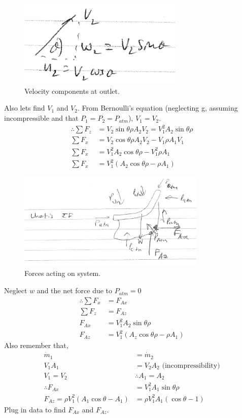 \documentclass[class=report, crop=false, 12pt,a4paper]{standalone}
\begin{document}
\begin{figure}
  \centering
  \includegraphics[width = 0.7\textwidth]{../img/Vanexample2}
  \caption{Velocity components at outlet.}
\end{figure}
Also lets find $V_1$ and $V_2$. From Bernoulli's equation (neglecting g, assuming incompressible and that $P_1 = P_2 = P_{atm}$), $V_1 = V_2$.
\begin{align}
  \therefore \sum F_z &= V_2 \sin{\theta} \rho A_2 V_2 = V_1^2 A_2 \sin{\theta} \rho \\
  \sum F_x &= V_2 \cos{\theta} \rho A_2 V_2 - V_1 \rho A_1 V_1\\
  \sum F_x &= V_1^2 A_2 \cos{\theta} \rho - V_1^2 \rho A_1 \\
  \sum F_x &= V_1^2 (A_2 \cos{\theta} \rho - \rho A_1)
\end{align}
\begin{figure}
  \centering
  \includegraphics[width = 0.8\textwidth]{../img/Vanexample3}
  \caption{Forces acting on system.}
\end{figure}
Neglect $w$ and the net force due to $P_{atm} = 0$
\begin{align}
  \therefore \sum F_x &= F_{Ax}\\
  \sum F_z &= F_{Az}\\
  F_{Ax} &= V_1^2 A_2 \sin{\theta} \rho\\
  F_{Az} &= V_1^2 (A_z \cos{\theta} \rho - \rho A_1)
\end{align}
Also remember that,
\begin{align}
  \dot{m}_1 &= \dot{m}_2\\
  V_1 A_1 &= V_2 A_2 \textrm{ (incompressibility)}\\
  V_1 = V_2 &\therefore A_1 = A_2\\
  \therefore F_{Ax} &= V_1^2 A_1 \sin{\theta} \rho \\
  F_{Az} = \rho V_1^2 (A_1 \cos{\theta} - A_1) &= \rho V_1^2 A_1 (\cos{\theta} - 1)
\end{align}
Plug in data to find $F_{Ax}$ and $F_{Az}$.
\end{document}
